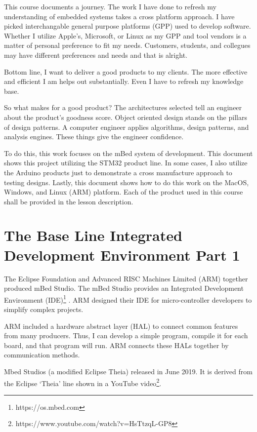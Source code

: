 \documentclass{article}
\begin{document}
This course documents a journey.  The work I have done to refresh my understanding of embedded systems takes a cross platform approach.  I have picked interchangable general purpose platforms (GPP) used to develop software.  Whether I utilize Apple's, Microsoft, or Linux as my GPP and tool vendors is a matter of personal preference to fit my needs.  Customers, students, and collegues may have different preferences and needs and that is alright.

Bottom line, I want to deliver a good products to my clients.  The more effective and efficient I am helps out substantially.   Even I have to refresh my knowledge base.

So what makes for a good product?  The architectures selected tell an engineer about the product's goodness score.  Object oriented design stands on the pillars of design patterns.  A computer engineer applies algorithms, design patterns, and analysis engines.  These things give the engineer confidence.

To do this, this work focuses on the mBed system of development. This document shows this project utilizing the STM32 product line. In some cases, I also utilize the Arduino products just to demonstrate a cross manufacture approach to testing designs. Lastly, this document shows how to do this work on the MacOS, Windows, and Linux (ARM) platform.  Each of the product used in this course shall be provided in the lesson description.



\newpage
\section{The Base Line Integrated Development Environment Part 1} %
\label{sec:the_base_line_integrated_development_environment_part_1}
The Eclipse Foundation and Advanced RISC Machines Limited (ARM) together produced mBed Studio.  The mBed Studio provides an Integrated Development Environment (IDE)\footnote{https://os.mbed.com} .  ARM designed their IDE for micro-controller developers to simplify complex projects. 

ARM included a hardware abstract layer (HAL) to connect common features from many producers. Thus, I can develop a simple program, compile it for each board, and that program will run. ARM connects these HALs together by communication methods.

Mbed Studios (a modified Eclipse Theia) released in June 2019. It is derived from the Eclipse ‘Theia’ line shown in a YouTube video\footnote{https://www.youtube.com/watch?v=HsTtzqL-GP8}. 
\end{document}
